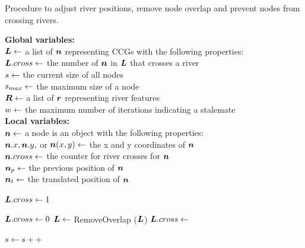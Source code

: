 \begin{algorithm}[tb!]
    \caption{Procedure to adjust river positions, remove node overlap and prevent nodes from crossing rivers.}\label{alg:UpdateLayout}
    \textbf{Global variables:} \\
    $ \bm{L} \gets $ a list of $ \bm{n} $ representing CCGs with the following properties: \\
    \-\hspace{1em}  $\bm{L}.cross \gets $ the number of $ \bm{n} $ in $ \bm{L} $ that crosses a river \\
    $ s \gets $ the current size of all nodes \\
    $ s_{max} \gets $ the maximum size of a node \\
    $ \bm{R} \gets $ a list of $ \bm{r} $ representing river features \\
    $ w \gets $ the maximum number of iterations indicating a stalemate \\

    \textbf{Local variables:} \\
    $ \bm{n} \gets $ a node is an object with the following properties: \\
    \-\hspace{1em} $ \bm{n}.x, \bm{n}.y, $ or $ \bm{n}(x,y) \gets $ the x and y coordinates of $ \bm{n} $ \\
    \-\hspace{1em} $ \bm{n}.cross \gets $ the counter for river crosses for $ \bm{n} $ \\
    \-\hspace{1em} $ \bm{n}_{p} \gets $ the previous position of $ \bm{n} $ \\
    \-\hspace{1em} $ \bm{n}_t \gets $ the translated position of $ \bm{n} $ \\

    \begin{algorithmic}[1]
        \While{$ \nodeSize < \nodeSizeMax $}
            \State $ \bm{L}.cross \gets 1 $ 

                \State $ \bm{L}.cross \gets 0 $
                \State $ \bm{L} \gets $ RemoveOverlap ($ \bm{L} $)
                \State {}
                \State $\bm{L}.cross \gets $ 

            \EndWhile

            \State $ s \gets s ++$

        \EndWhile

        \EndProcedure
    \end{algorithmic}
\end{algorithm}


